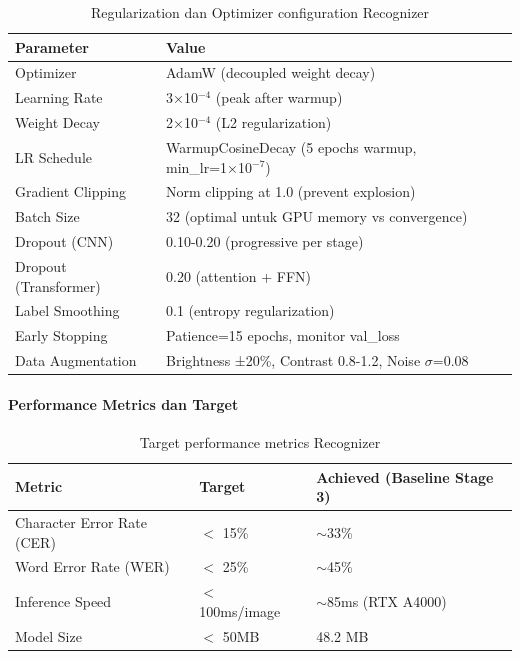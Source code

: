\documentclass[12pt,a4paper]{article}
\begin{document}
\begin{table}[H]
\centering
\caption{Regularization dan Optimizer configuration Recognizer}
\label{tab:recognizer-training-config}
\small
\begin{tabular}{|l|l|}
\hline
\textbf{Parameter} & \textbf{Value} \\
\hline
Optimizer & AdamW (decoupled weight decay) \\
\hline
Learning Rate & 3×10$^{-4}$ (peak after warmup) \\
\hline
Weight Decay & 2×10$^{-4}$ (L2 regularization) \\
\hline
LR Schedule & WarmupCosineDecay (5 epochs warmup, min\_lr=1×10$^{-7}$) \\
\hline
Gradient Clipping & Norm clipping at 1.0 (prevent explosion) \\
\hline
Batch Size & 32 (optimal untuk GPU memory vs convergence) \\
\hline
Dropout (CNN) & 0.10-0.20 (progressive per stage) \\
\hline
Dropout (Transformer) & 0.20 (attention + FFN) \\
\hline
Label Smoothing & 0.1 (entropy regularization) \\
\hline
Early Stopping & Patience=15 epochs, monitor val\_loss \\
\hline
Data Augmentation & Brightness ±20\%, Contrast 0.8-1.2, Noise $\sigma$=0.08 \\
\hline
\end{tabular}
\end{table}

\paragraph{Performance Metrics dan Target}

\begin{table}[H]
\centering
\caption{Target performance metrics Recognizer}
\label{tab:recognizer-performance-target}
\small
\begin{tabular}{|l|l|l|}
\hline
\textbf{Metric} & \textbf{Target} & \textbf{Achieved (Baseline Stage 3)} \\
\hline
Character Error Rate (CER) & $<$ 15\% & $\sim$33\% \\
\hline
Word Error Rate (WER) & $<$ 25\% & $\sim$45\% \\
\hline
Inference Speed & $<$ 100ms/image & $\sim$85ms (RTX A4000) \\
\hline
Model Size & $<$ 50MB & 48.2 MB \\
\hline
\end{tabular}
\end{table}
\end{document}

